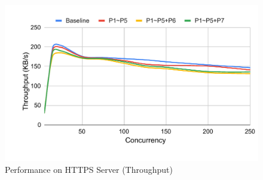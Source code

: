 \begin{figure}[htbp]
\centerline{\includegraphics[scale=0.5]{figures/fg-https-tp.pdf}}
\caption{Performance on HTTPS Server (Throughput)}\label{fg-https-tp}
\end{figure}